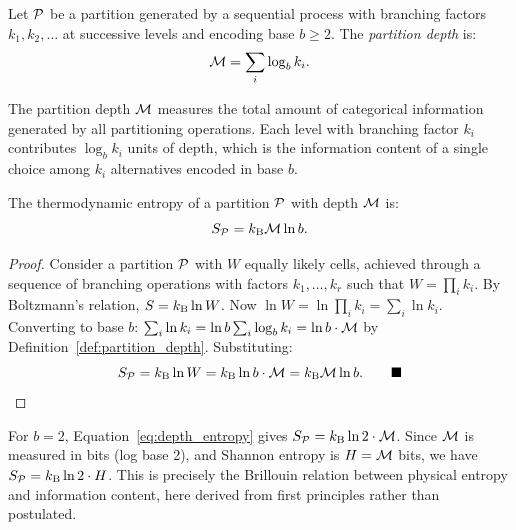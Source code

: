 \begin{definition}
\label{def:partition_depth}
Let $\mathcal{P}$ be a partition generated by a sequential process with branching
factors $k_1, k_2, \ldots$ at successive levels and encoding base $b \geq 2$.
The \emph{partition depth} is:
\begin{equation}
  \mathcal{M} = \sum_i \log_b k_i.
  \label{eq:partition_depth}
\end{equation}
\end{definition}

The partition depth $\mathcal{M}$ measures the total amount of categorical information
generated by all partitioning operations. Each level with branching factor $k_i$
contributes $\log_b k_i$ units of depth, which is the information content of
a single choice among $k_i$ alternatives encoded in base $b$.

\begin{theorem}
\label{thm:depth_entropy}
The thermodynamic entropy of a partition $\mathcal{P}$ with depth $\mathcal{M}$ is:
\begin{equation}
  S_{\mathcal{P}} = k_{\mathrm{B}} \mathcal{M} \ln b.
  \label{eq:depth_entropy}
\end{equation}
\end{theorem}

\begin{proof}
Consider a partition $\mathcal{P}$ with $W$ equally likely cells, achieved through
a sequence of branching operations with factors $k_1, \ldots, k_r$ such that
$W = \prod_i k_i$. By Boltzmann's relation, $S = k_{\mathrm{B}} \ln W$.
Now $\ln W = \ln \prod_i k_i = \sum_i \ln k_i$.
Converting to base $b$: $\sum_i \ln k_i = \ln b \sum_i \log_b k_i = \ln b \cdot \mathcal{M}$
by Definition~\ref{def:partition_depth}. Substituting:
\begin{equation}
  S_{\mathcal{P}} = k_{\mathrm{B}} \ln W = k_{\mathrm{B}} \ln b \cdot \mathcal{M} = k_{\mathrm{B}} \mathcal{M} \ln b. \qquad\blacksquare
\end{equation}
\end{proof}

\begin{remark}
For $b = 2$, Equation~\eqref{eq:depth_entropy} gives $S_{\mathcal{P}} = k_{\mathrm{B}} \ln 2 \cdot \mathcal{M}$.
Since $\mathcal{M}$ is measured in bits (log base 2), and Shannon entropy is
$H = \mathcal{M}$ bits, we have $S_{\mathcal{P}} = k_{\mathrm{B}} \ln 2 \cdot H$. This is precisely
the Brillouin relation between physical entropy and information content,
here derived from first principles rather than postulated.
\end{remark}

